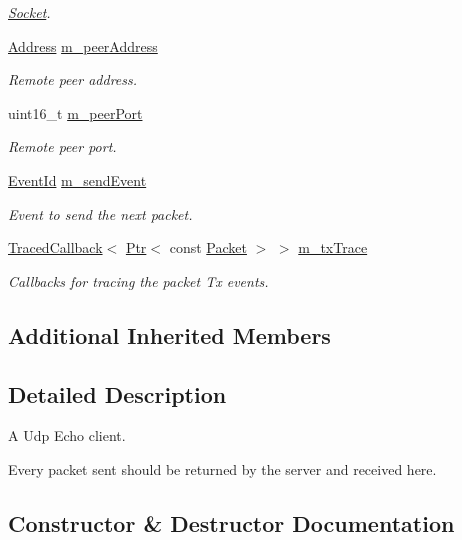 \begin{DoxyCompactItemize}
\begin{DoxyCompactList}\small\item\em \hyperlink{classns3_1_1Socket}{Socket}. \end{DoxyCompactList}\item 
\hyperlink{classns3_1_1Address}{Address} \hyperlink{classns3_1_1UdpEchoClient_a93144bb99de23e9e585a6208705b634d}{m\+\_\+peer\+Address}
\begin{DoxyCompactList}\small\item\em Remote peer address. \end{DoxyCompactList}\item 
uint16\+\_\+t \hyperlink{classns3_1_1UdpEchoClient_ad0c121fcf7f16062990312ca26c8dcc0}{m\+\_\+peer\+Port}
\begin{DoxyCompactList}\small\item\em Remote peer port. \end{DoxyCompactList}\item 
\hyperlink{classns3_1_1EventId}{Event\+Id} \hyperlink{classns3_1_1UdpEchoClient_a593a5c30ddbb9b8ad69d86c7b466f9db}{m\+\_\+send\+Event}
\begin{DoxyCompactList}\small\item\em Event to send the next packet. \end{DoxyCompactList}\item 
\hyperlink{classns3_1_1TracedCallback}{Traced\+Callback}$<$ \hyperlink{classns3_1_1Ptr}{Ptr}$<$ const \hyperlink{classns3_1_1Packet}{Packet} $>$ $>$ \hyperlink{classns3_1_1UdpEchoClient_aaa176c93342f61d89a4479080dfba1f9}{m\+\_\+tx\+Trace}
\begin{DoxyCompactList}\small\item\em Callbacks for tracing the packet Tx events. \end{DoxyCompactList}\end{DoxyCompactItemize}
\subsection*{Additional Inherited Members}


\subsection{Detailed Description}
A Udp Echo client. 

Every packet sent should be returned by the server and received here. 

\subsection{Constructor \& Destructor Documentation}
